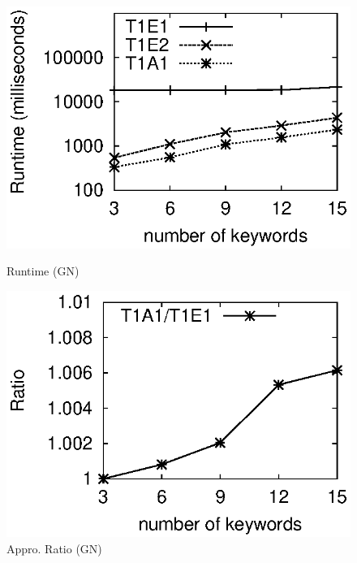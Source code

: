 \documentclass{sig-alternate}
\begin{document}
\begin{figure}[h]
\vspace{-1ex}
\begin{minipage}[bt]{1.6in}
 \includegraphics[scale=0.5]{figure/GNtime}\vspace{-2ex}
\caption{Runtime (GN)} \label{fig:gntime}
\end{minipage}\hspace{2mm}
\begin{minipage}[bt]{1.6in}
 \includegraphics[scale=0.5]{figure/GNratio}\vspace{-2ex}
\caption{Appro. Ratio (GN)} \label{fig:gnratio}
\end{minipage}
\end{figure}
\end{document}
